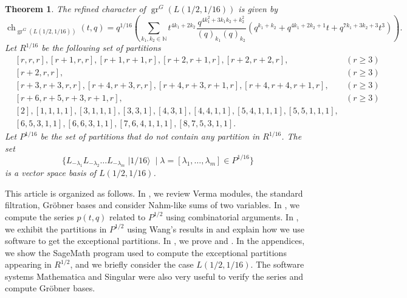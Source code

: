 \documentclass[a4paper, 12pt, reqno]{amsart}
\newtheorem{theorem}{Theorem}[section]
\theoremstyle{remark}
\DeclareMathOperator{\gr}{gr}
\DeclareMathOperator{\ch}{ch}
\DeclareMathOperator{\vacsixteen}{|1/16\rangle}
\begin{document}
\begin{theorem}
  \label{thr:5}
  The refined character of $\gr^G(L(1/2, 1/16))$ is given by
  \begin{equation*}
    \ch_{\gr^G(L(1/2, 1/16))}(t, q) = q^{1/16}\left(\sum_{k_1, k_2 \in \mathbb{N}}t^{4k_1 + 2k_2}\frac{q^{4k_1^2 + 3k_1k_2 + k_2^2}}{(q)_{k_1}(q)_{k_2}}(q^{k_1 + k_2} + q^{4k_1 + 2k_2 + 1}t + q^{7k_1 + 3k_2 + 3}t^3)\right).
  \end{equation*}
  Let $R^{1/16}$ be the following set of partitions
  \begin{align*}
    &[r, r, r], [r + 1, r, r], [r + 1, r + 1, r], [r + 2, r + 1, r], [r + 2, r + 2, r], &(r \ge 3) \\
    &[r + 2, r, r], &(r \ge 3) \\
    &[r + 3, r + 3, r, r], [r + 4, r + 3, r, r],  [r + 4, r + 3, r + 1, r], [r + 4, r + 4, r + 1, r], &(r \ge 3)\\
    &[r + 6, r + 5, r + 3, r + 1, r], &(r \ge 3) \\
    &[2], [1, 1, 1, 1], [3, 1, 1, 1], [3, 3, 1], [4, 3, 1], [4, 4, 1, 1], [5, 4, 1, 1, 1], [5, 5, 1, 1, 1], \\
    &[6, 5, 3, 1, 1], [6, 6, 3, 1, 1], [7, 6, 4, 1, 1, 1], [8, 7, 5, 3, 1, 1].
  \end{align*}
  Let $P^{1/16}$ be the set of partitions that do not contain any partition in $R^{1/16}$.
  The set
  \begin{equation*}
    \{L_{-\lambda_1}L_{-\lambda_2}\dots L_{-\lambda_m}\vacsixteen \mid \lambda = [\lambda_1, \dots, \lambda_m] \in P^{1/16}\}
  \end{equation*}
  is a vector space basis of $L(1/2, 1/16)$.
\end{theorem}

This article is organized as follows.
In , we review Verma modules, the standard filtration, Gröbner bases and consider Nahm-like sums of two variables.
In , we compute the series $p(t, q)$ related to $P^{1/2}$ using combinatorial arguments.
In , we exhibit the partitions in $P^{1/2}$ using Wang's results in \cite{wang_rationality_1993} and explain how we use software to get the exceptional partitions.
In , we prove  and .
In the appendices, we show the SageMath \cite{sagemath} program used to compute the exceptional partitions appearing in $R^{1/2}$, and we briefly consider the case $L(1/2, 1/16)$.
The software systems Mathematica \cite{Mathematica} and Singular \cite{Singular} were also very useful to verify the series and compute Gröbner bases.
\end{document}
